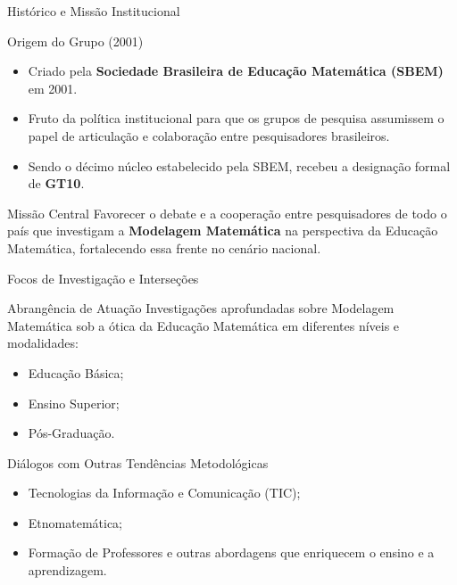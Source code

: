 \documentclass[10pt, aspectratio=169]{beamer}
\begin{document}
\begin{frame}{Histórico e Missão Institucional}
    \transsplitverticalin[duration=0.4]
    \begin{block}{Origem do Grupo (2001)}
        \begin{itemize}
            \item Criado pela \textbf{Sociedade Brasileira de Educação Matemática (SBEM)} em 2001.
            \pause
            \item Fruto da política institucional para que os grupos de pesquisa assumissem o papel de articulação e colaboração entre pesquisadores brasileiros.
            \pause
            \item Sendo o décimo núcleo estabelecido pela SBEM, recebeu a designação formal de \textbf{GT10}.
        \end{itemize}
    \end{block}
    \pause
    \begin{alertblock}{Missão Central}
        Favorecer o debate e a cooperação entre pesquisadores de todo o país que investigam a \textbf{Modelagem Matemática} na perspectiva da Educação Matemática, fortalecendo essa frente no cenário nacional.
    \end{alertblock}
\end{frame}

\begin{frame}{Focos de Investigação e Interseções}
    \transwipe[direction=90, duration=0.4]
    \begin{block}{Abrangência de Atuação}
        Investigações aprofundadas sobre Modelagem Matemática sob a ótica da Educação Matemática em diferentes níveis e modalidades:
        \begin{itemize}
            \item Educação Básica;
            \item Ensino Superior;
            \item Pós-Graduação.
        \end{itemize}
    \end{block}
    \pause
    \begin{exampleblock}{Diálogos com Outras Tendências Metodológicas}
        \begin{itemize}
            \item Tecnologias da Informação e Comunicação (TIC);
            \pause
            \item Etnomatemática;
            \pause
            \item Formação de Professores e outras abordagens que enriquecem o ensino e a aprendizagem.
        \end{itemize}
    \end{exampleblock}
\end{frame}
\end{document}
